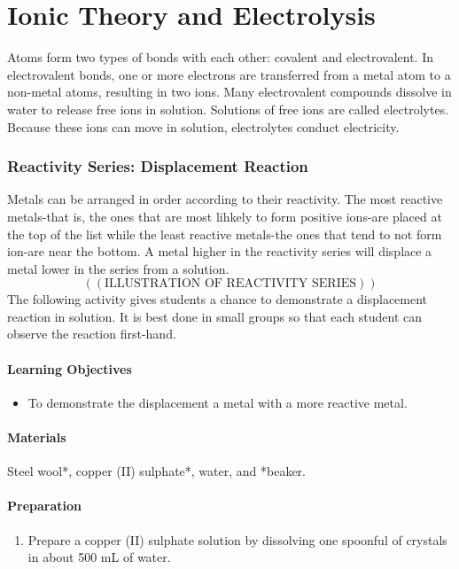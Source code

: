\chapter{Ionic Theory and Electrolysis}

Atoms form two types of bonds with each other: covalent and electrovalent. In electrovalent bonds, one or more electrons are transferred from a metal atom to a non-metal atoms, resulting in two ions. Many electrovalent compounds dissolve in water to release free ions in solution. Solutions of free ions are called electrolytes. Because these ions can move in solution, electrolytes conduct electricity.

\subsection{Reactivity Series: Displacement Reaction}

Metals can be arranged in order according to their reactivity. The most reactive metals-that is, the ones that are most lihkely to form positive ions-are placed at the top of the list while the least reactive metals-the ones that tend to not form ion-are near the bottom. A metal higher in the reactivity series will displace a metal lower in the series from a solution. 
$$((\mbox {ILLUSTRATION OF REACTIVITY SERIES}))$$
The following activity gives students a chance to demonstrate a displacement reaction in solution. It is best done in small groups so that each student can observe the reaction first-hand.
\subsubsection*{Learning Objectives}
\begin{itemize}
\item{To demonstrate the displacement a metal with a more reactive metal.}
\end{itemize}

\subsubsection*{Materials}
Steel wool*, copper (II) sulphate*, water, and *beaker.

\subsubsection*{Preparation}
\begin{enumerate}
\item{Prepare a copper (II) sulphate solution by dissolving one spoonful of crystals in about 500 mL of water.}
\end{enumerate}

